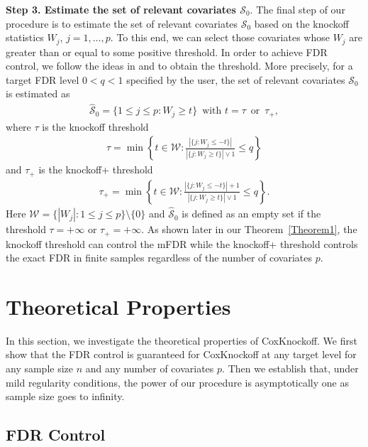 \documentclass[11pt]{article}
\begin{document}
{\bf Step 3. 
	Estimate the set of relevant covariates $\mathcal{S}_0$}. The final step of our procedure is to estimate the set of relevant covariates $\mathcal{S}_0$ based on the knockoff statistics $W_j$, $j=1, \ldots, p$. 
To this end, we can select those covariates whose $W_j$ are greater than or equal to some positive threshold.  In order to achieve FDR control, 
we follow the ideas
in \cite{barber2015controlling} and \cite{candes2018panning} to obtain the  threshold. More precisely, for a target FDR level $0<q<1$ specified by the user, the set of relevant covariates $\mathcal{S}_0$ is estimated as 
\begin{align}\label{eq: S0_hat}
\widehat{\mathcal{S}}_0 = \{1\leq j\leq p: W_j\geq t\}\,\,\,\mbox{with}\,\,t=\tau \,\,\,\mbox{or}\,\,\, \tau_{+}, 
\end{align}
where $\tau$ is the knockoff threshold 
\begin{align}\label{eq: tau}
\tau = \min\left\{t\in \mathcal{W}: \frac{|\{j: W_j \leq -t\}|}{|\{j: W_j \geq t\}|\vee 1}\leq q\right\}
\end{align}
and $\tau_{+}$ is the knockoff+ threshold 
\begin{align}\label{eq: tau+}
\tau_+ = \min\left\{t\in \mathcal{W}: \frac{|\{j: W_j \leq -t\}|+1}{|\{j: W_j \geq t\}|\vee 1}\leq q\right\}.
\end{align}
Here $\mathcal{W}=\{|W_j|: 1\leq j\leq p\}\setminus\{0\}$ and $\widehat{\mathcal{S}}_0$ is defined as an empty set if the threshold $\tau=+\infty$ or $\tau_{+}=+\infty$. As shown later in our Theorem~\ref{Theorem1}, the knockoff threshold can control the mFDR while the knockoff+ threshold controls the exact FDR 
in finite samples regardless of the number of covariates $p$. 


\section{Theoretical Properties}\label{sec: theory}

In this section, we investigate the theoretical properties of CoxKnockoff.  
We first show that the FDR control is guaranteed for
CoxKnockoff at any target level 
for any sample size $n$ and any number of covariates $p$. 
Then we 
establish that, under mild regularity conditions, the power of our procedure is asymptotically one as sample size goes to infinity.

\subsection{FDR Control}
\end{document}
